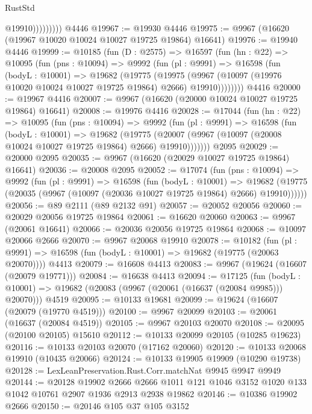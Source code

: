 \begin{lexlean}{RustStd}
\begin{coremodule}
                      @19910)))))))))
    @4446
@19967 := @19930 @4446
@19975 := @9967 (@16620 (@19967 @10020 @10024 @10027 @19725 @19864) @16641)
@19976 := @19940 @4446
@19999 := @10185
    (fun (D : @2575) =>
    @16597
      (fun (hn : @22) =>
      @10095
        (fun (pns : @10094) =>
        @9992
          (fun (pl : @9991) =>
          @16598
            (fun (bodyL : @10001) =>
            @19682
              (@19775
                (@19975
                  (@9967 (@10097 (@19976 @10020 @10024 @10027 @19725 @19864) @2666) @19910))))))))
    @4416
@20000 := @19967 @4416
@20007 := @9967 (@16620 (@20000 @10024 @10027 @19725 @19864) @16641)
@20008 := @19976 @4416
@20028 := @17044
    (fun (hn : @22) =>
    @10095
      (fun (pns : @10094) =>
      @9992
        (fun (pl : @9991) =>
        @16598
          (fun (bodyL : @10001) =>
          @19682
            (@19775 (@20007 (@9967 (@10097 (@20008 @10024 @10027 @19725 @19864) @2666) @19910)))))))
    @2095
@20029 := @20000 @2095
@20035 := @9967 (@16620 (@20029 @10027 @19725 @19864) @16641)
@20036 := @20008 @2095
@20052 := @17074
    (fun (pns : @10094) =>
    @9992
      (fun (pl : @9991) =>
      @16598
        (fun (bodyL : @10001) =>
        @19682 (@19775 (@20035 (@9967 (@10097 (@20036 @10027 @19725 @19864) @2666) @19910))))))
@20056 := @89 @2111 (@89 @2132 @91)
@20057 := @20052 @20056
@20060 := @20029 @20056 @19725 @19864
@20061 := @16620 @20060
@20063 := @9967 (@20061 @16641)
@20066 := @20036 @20056 @19725 @19864
@20068 := @10097 @20066 @2666
@20070 := @9967 @20068 @19910
@20078 := @10182
    (fun (pl : @9991) => @16598 (fun (bodyL : @10001) => @19682 (@19775 (@20063 @20070))))
    @4413
@20079 := @16608 @4413
@20083 := @9967 (@19624 (@16607 (@20079 @19771)))
@20084 := @16638 @4413
@20094 := @17125
    (fun (bodyL : @10001) => @19682 (@20083 (@9967 (@20061 (@16637 (@20084 @9985))) @20070)))
    @4519
@20095 := @10133 @19681
@20099 := @19624 (@16607 (@20079 (@19770 @4519)))
@20100 := @9967 @20099
@20103 := @20061 (@16637 (@20084 @4519))
@20105 := @9967 @20103 @20070
@20108 := @20095 (@20100 @20105) @15610
@20112 := @10133 @20099 @20105 (@10285 @19623)
@20116 := @10133 @20103 @20070 (@17162 @20060)
@20120 := @10133 @20068 @19910 (@10435 @20066)
@20124 := @10133 @19905 @19909 (@10290 @19738)
@20128 := LexLeanPreservation.Rust.Corr.matchNat @9945 @9947 @9949
@20144 := @20128
    @19902
    @2666
    @2666
    @1011
    @121
    @1046
    @3152
    @1020
    @133
    @1042
    @10761
    @2907
    @1936
    @2913
    @2938
    @19862
@20146 := @10386 @19902 @2666
@20150 := @20146 @105 @37 @105 @3152

\end{coremodule}
\end{lexlean}
